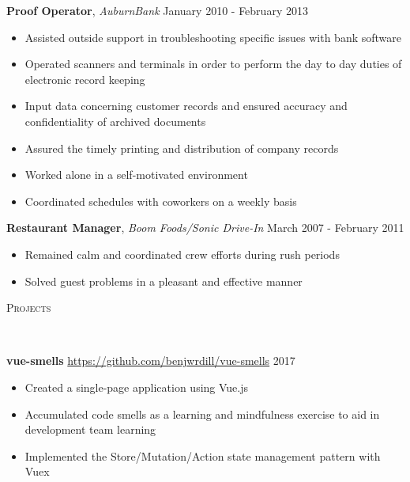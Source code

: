 \documentclass[9pt]{article}
\newenvironment{changemargin}[2]{%
  \begin{list}{}{%
    \setlength{\topsep}{0pt}%
    \setlength{\leftmargin}{#1}%
    \setlength{\rightmargin}{#2}%
    \setlength{\listparindent}{\parindent}%
    \setlength{\itemindent}{\parindent}%
    \setlength{\parsep}{\parskip}%
  }%
  \item[]}{\end{list}
}
\newcommand{\lineover}{
	\begin{changemargin}{-0.05in}{-0.05in}
		\vspace*{-8pt}
		\hrulefill \\
		\vspace*{-2pt}
	\end{changemargin}
}
\newcommand{\header}[1]{
	\begin{changemargin}{-0.5in}{-0.5in}
		\scshape{#1}\\
  	\lineover
	\end{changemargin}
}
\newenvironment{body} {
	\vspace*{-16pt}
	\begin{changemargin}{-0.25in}{-0.5in}
  }	
	{\end{changemargin}
}
\begin{document}
\begin{body}
	\textbf{Proof Operator}, \emph{AuburnBank} \hfill January 2010 - February 2013 \\
	\vspace*{-4pt}
	\begin{itemize} \itemsep -0pt  %
		\item Assisted outside support in troubleshooting specific issues with bank software
		\item Operated scanners and terminals in order to perform the day to day duties of electronic record keeping
		\item Input data concerning customer records and ensured accuracy and confidentiality of archived documents
		\item Assured the timely printing and distribution of company records
		\item Worked alone in a self-motivated environment
		\item Coordinated schedules with coworkers on a weekly basis
	\end{itemize}
	\vspace{17pt}

	\textbf {Restaurant Manager}, \emph{Boom Foods/Sonic Drive-In} \hfill March 2007 - February 2011\\
	\vspace*{-4pt}
	\begin{itemize} \itemsep -0pt
		\item Remained calm and coordinated crew efforts during rush periods
		\item Solved guest problems in a pleasant and effective manner
	\end{itemize}
\end{body}

\smallskip

\header{Projects}

\begin{body}
	\vspace{17pt}
	\textbf{vue-smells} \url{https://github.com/benjwrdill/vue-smells} \hfill{} 2017
	\begin{itemize}
		\item{Created a single-page application using Vue.js}
		\item{Accumulated code smells as a learning and mindfulness exercise to aid in development team learning}
		\item{Implemented the Store/Mutation/Action state management pattern with Vuex}
	\end{itemize}
\end{body}
\end{document}
